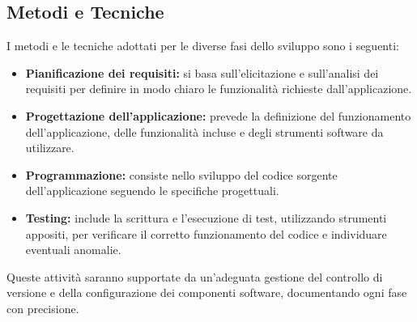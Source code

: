 \documentclass[a4paper,12pt]{article}
\begin{document}
\subsection{Metodi e Tecniche} %
I metodi e le tecniche adottati per le diverse fasi dello sviluppo sono i seguenti:
\begin{itemize}
    \item \textbf{Pianificazione dei requisiti:} si basa sull'elicitazione e sull'analisi dei requisiti per definire in modo chiaro le funzionalità richieste dall'applicazione.
    \item \textbf{Progettazione dell’applicazione:} prevede la definizione del funzionamento dell'applicazione, delle funzionalità incluse e degli strumenti software da utilizzare.
    \item \textbf{Programmazione:} consiste nello sviluppo del codice sorgente dell’applicazione seguendo le specifiche progettuali.
    \item \textbf{Testing:} include la scrittura e l’esecuzione di test, utilizzando strumenti appositi, per verificare il corretto funzionamento del codice e individuare eventuali anomalie.
\end{itemize}
Queste attività saranno supportate da un’adeguata gestione del controllo di versione e della configurazione dei componenti software, documentando ogni fase con precisione.
\end{document}
